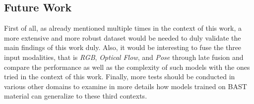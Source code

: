 \documentclass[extern,palatino]{cgMA}
\begin{document}
\subsection{Future Work}
\label{future_work}

First of all, as already mentioned multiple times in the context of this work, a more extensive and more robust dataset would be needed to duly validate the main findings of this work duly. Also, it would be interesting to fuse the three input modalities, that is \textit{RGB}, \textit{Optical Flow}, and \textit{Pose} through late fusion and compare the performance as well as the complexity of such models with the ones tried in the context of this work. Finally, more tests should be conducted in various other domains to examine in more details how models trained on BAST material can generalize to these third contexts. 

\newpage


\end{document}
